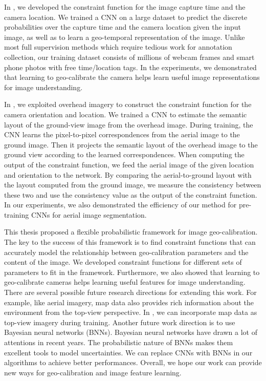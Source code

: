 In , we developed the constraint function for 
the image capture time and the camera location. 
We trained a CNN on a large dataset to predict the discrete
probabilities over the capture time and the camera location given the
input image, as well as to learn a geo-temporal representation
of the image.
Unlike most full supervision methods which require tedious work for 
annotation collection, our training dataset consists of millions of webcam
frames and smart phone photos with free time/location tags.
In the experiments, we demonstrated that learning to geo-calibrate the
camera helps learn useful image representations for image understanding.

In , we exploited overhead imagery to construct
the constraint function for the camera orientation and location.
We trained a CNN to estimate the semantic layout of the
ground-view image from the overhead image. During training, the CNN
learns the pixel-to-pixel correspondences from the aerial image to the
ground image. Then it projects the semantic layout of the overhead
image to the ground view according to the learned correspondences.
When computing the output of the constraint function, we feed the
aerial image of the given location and orientation to the network. By
comparing the aerial-to-ground layout with the layout computed from
the ground image, we measure the consistency between these two and use
the consistency value as the output of the constraint function. 
In our experiments, we also demonstrated the efficiency of our method
for pre-training CNNs for aerial image segmentation.

This thesis proposed a flexible probabilistic framework for image
geo-calibration. The key to the success of this framework is to find
constraint functions that can accurately model the relationship between
geo-calibration parameters and the content of the image. 
We developed constraint functions for different sets of parameters to
fit in the framework. 
Furthermore, we also showed that learning to geo-calibrate cameras helps
learning useful features for image understanding. 
%
There are several possible future research directions for extending
this work. For example, like aerial imagery, map data also
provides rich information about the environment from the top-view
perspective. In , we can incorporate map data
as top-view imagery during training.
%
Another future work direction is to use Bayesian neural networks
(BNNs). Bayesian neural networks have drawn a lot
of attentions in recent years. The probabilistic nature of BNNs makes
them excellent tools to model uncertainties. We can replace CNNs
with BNNs in our algorithms to achieve better performances.
Overall, we hope our work can provide new ways for geo-calibration and
image feature learning.
